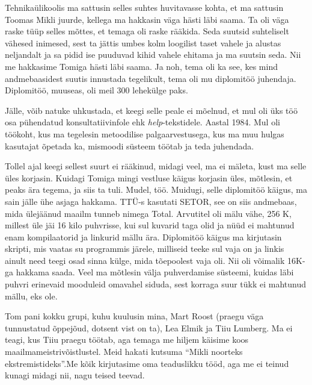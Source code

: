  
Tehnikaülikoolis ma sattusin selles suhtes huvitavasse kohta, et ma sattusin 
Toomas Mikli juurde, kellega ma hakkasin väga hästi 
läbi saama. Ta oli väga raske tüüp selles mõttes, et temaga oli raske rääkida. 
Seda suutsid suhteliselt vähesed inimesed, sest ta jättis umbes kolm loogilist 
taset vahele ja alustas neljandalt ja sa pidid ise puuduvad kihid vahele 
ehitama ja ma suutsin seda. Nii me hakkasime Tomiga hästi läbi saama. Ja noh, 
tema oli ka see, kes mind andmebaasidest suutis  innustada tegelikult, tema oli 
mu diplomitöö juhendaja. Diplomitöö, muuseas, oli meil 300 lehekülge paks. 

Jälle, võib natuke uhkustada, et keegi selle peale ei mõelnud, et mul oli üks 
töö osa pühendatud konsultatiivinfole ehk \emph{help}-tekstidele. Aastal 1984. 
Mul oli töökoht, kus ma tegelesin metoodilise palgaarvestusega, kus ma muu 
hulgas kasutajat õpetada ka, mismoodi süsteem töötab ja teda juhendada. 


Tollel ajal keegi sellest suurt ei rääkinud, midagi veel, ma ei mäleta, kust ma 
selle üles korjasin. Kuidagi Tomiga mingi vestluse käigus korjasin üles, 
mõtlesin, et peaks ära tegema, ja siis ta tuli. Mudel, töö. Muidugi, selle 
diplomitöö käigus, ma sain jälle ühe asjaga hakkama. TTÜ-s kasutati 
SETOR, see on siis andmebaas, mida ülejäänud 
maailm tunneb nimega Total. Arvutitel 
oli mälu vähe, 256 K, millest üle jäi 16 kilo puhvrisse, kui sul kuvarid taga 
olid ja nüüd ei mahtunud enam kompilaatorid ja linkurid mällu ära. Diplomitöö 
käigus ma kirjutasin skripti, mis vaatas su programmis järele, milliseid teeke 
sul vaja on ja linkis ainult need teegi osad sinna külge, mida tõepoolest vaja 
oli. Nii oli võimalik 16K-ga hakkama saada. Veel ma mõtlesin välja puhverdamise 
süsteemi, kuidas läbi puhvri erinevaid mooduleid omavahel siduda, sest korraga 
suur tükk ei mahtunud mällu, eks ole. 

Tom pani kokku grupi, kuhu kuulusin mina, Mart Roost 
(praegu väga tunnustatud õppejõud, dotsent vist on ta), Lea 
Elmik ja Tiiu Lumberg. Ma ei 
teagi, kus Tiiu praegu töötab, aga temaga me hiljem käisime koos 
maailmameistrivõistlustel. Meid hakati kutsuma \enquote{Mikli noorteks 
ekstremistideks}.Me  kõik kirjutasime oma teaduslikku tööd, aga me ei teinud 
kunagi midagi nii, nagu teised teevad. 

